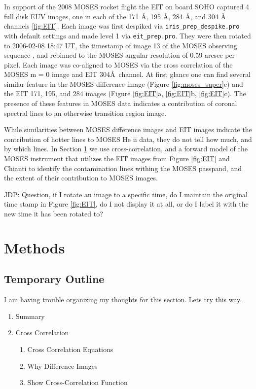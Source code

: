 \documentclass[]{solarphysics}
\newcommand{\jdp}[1]{{\color{blue} JDP: #1}} %
\begin{document}
\begin{article}
	In support of the 2008 MOSES rocket flight the \ac{EIT} \citep{EIT} on board SOHO \citep{SOHO} captured 4 full disk EUV images, one in each of the 171 {\AA}, 195 {\AA}, 284 {\AA}, and 304 {\AA} channels \ref{fig:EIT}. Each image was first despiked via \texttt{iris\_prep\_despike.pro} with default settings and made level 1 via \texttt{eit\_prep.pro}. They were then rotated to 2006-02-08 18:47 UT, the timestamp of image 13 of the MOSES observing sequence \citep{Fox2011}, and rebinned to the MOSES angular resolution of 0.59 arcsec per pixel.  Each image was co-aligned to MOSES via the cross correlation of the MOSES m = 0 image and EIT 304\AA \ channel. At first glance one can find several similar feature in the \ac{MOSES} difference image (Figure \ref{fig:moses_super}c) and the \ac{EIT} 171, 195, and 284 images (Figure \ref{fig:EIT}a, \ref{fig:EIT}b, \ref{fig:EIT}c).  The presence of these features in \ac{MOSES} data indicates a contribution of coronal spectral lines to an otherwise transition region image.  
	
	While similarities between \ac{MOSES} difference images and \ac{EIT} images indicate the contribution of hotter lines to \ac{MOSES} He {\sc ii} data, they do not tell how much, and by which lines.  In Section \ref{sec:methods} we use cross-correlation, and a forward model of the \ac{MOSES} instrument that utilizes the EIT images from Figure \ref{fig:EIT} and Chianti \citep{Chianti} to identify the contamination lines withing the MOSES passpand, and the extent of their contribution to MOSES images.
	 
	
	 \jdp{Question, if I rotate an image to a specific time, do I maintain the original time stamp in Figure \ref{fig:EIT}, do I not display it at all, or do I label it with the new time it has been rotated to?}
		
	
	

\section{Methods}
\label{sec:methods}
	\subsection{Temporary Outline}
		I am having trouble organizing my thoughts for this section.  Lets try this way.
		\begin{enumerate}
			\item Summary
			
			
			\item Cross Correlation
				\begin{enumerate}
					\item Cross Correlation Equations
					\item Why Difference Images
					\item Show Cross-Correlation Function
				\end{enumerate}
			

\end{enumerate}
\end{article}
\end{document}
